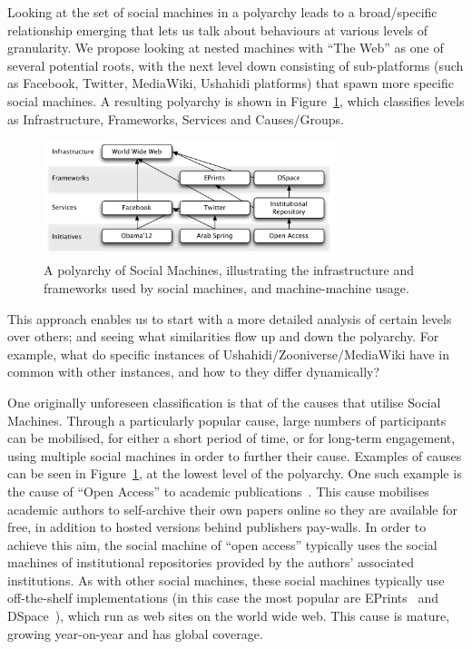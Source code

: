 \documentclass{sig-alternate}
\begin{document}
Looking at the set of social machines in a polyarchy leads to a broad/specific relationship emerging that lets us talk about behaviours at various levels of granularity.  We propose looking at nested machines with ``The Web'' as one of several potential roots, with the next level down consisting of sub-platforms (such as Facebook, Twitter, MediaWiki, Ushahidi platforms) that spawn more specific social machines. A resulting polyarchy is shown in Figure~\ref{polyarchy}, which classifies levels as Infrastructure, Frameworks, Services and Causes/Groups.

\begin{figure}[htb]
\begin{center}
\includegraphics[width=8.5cm]{img/polyarchy.pdf}
\caption{A polyarchy of Social Machines, illustrating the infrastructure and frameworks used by social machines, and machine-machine usage.} \label{polyarchy}
\end{center}
\end{figure}

This approach enables us to start with a more detailed analysis of certain levels over others;
and seeing what similarities flow up and down the polyarchy. For example, what do
specific instances of Ushahidi/Zooniverse/MediaWiki have in common with other instances, and
how to they differ dynamically?

One originally unforeseen classification is that of the causes that utilise Social Machines.
Through a particularly popular cause, large numbers of participants can be mobilised, for
either a short period of time, or for long-term engagement, using multiple social machines
in order to further their cause. Examples of causes can be seen in Figure~\ref{polyarchy},
at the lowest level of the polyarchy. One such example is the cause of ``Open Access'' to
academic publications~\cite{harnad2001self}. This cause mobilises academic authors to
self-archive their own papers online so they are available for free, in addition to hosted
versions behind publishers pay-walls. In order to achieve this aim, the social machine of
``open access'' typically uses the social machines of institutional repositories provided
by the authors' associated institutions. As with other social machines, these social
machines typically use off-the-shelf implementations (in this case the most popular are
EPrints~\cite{eprints} and DSpace~\cite{dspace}), which run as web sites on the world wide
web. This cause is mature, growing year-on-year and has global coverage.
\end{document}
